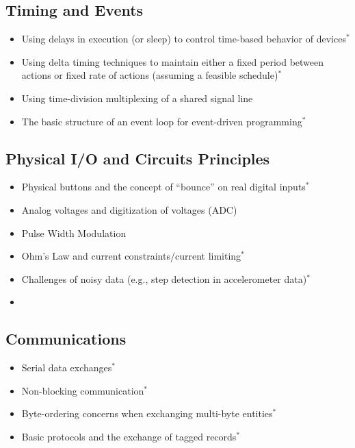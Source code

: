 \subsection{Timing and Events}
\label{sec:time}
\begin{itemize}
  \item Using delays in execution (or sleep) to control time-based behavior of devices$^*$
  \item Using delta timing techniques to maintain either a fixed period between actions or fixed rate of actions (assuming a feasible schedule)$^*$
  \item Using time-division multiplexing of a shared signal line
  \item The basic structure of an event loop for event-driven programming$^*$
\end{itemize}

\subsection{Physical I/O and Circuits Principles}
\label{sec:pio}
\begin{itemize}
  \item Physical buttons and the concept of ``bounce'' on real digital inputs$^*$
  \item Analog voltages and digitization of voltages (ADC)
  \item Pulse Width Modulation
  \item Ohm's Law and current constraints/current limiting$^*$
  \item Challenges of noisy data (e.g., step detection in accelerometer data)$^*$
  \item
\end{itemize}

\subsection{Communications}
\label{sec:comm}
\begin{itemize}
  \item Serial data exchanges$^*$
  \item Non-blocking communication$^*$
  \item Byte-ordering concerns when exchanging multi-byte entities$^*$
  \item Basic protocols and the exchange of tagged records$^*$
\end{itemize}

